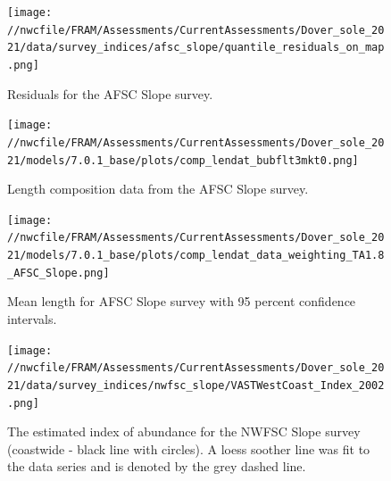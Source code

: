 \documentclass[11pt,
  english,
  a4paper,
]{article}
\begin{document}
\newpage


\begin{figure}
\centering
\texttt{[image: //nwcfile/FRAM/Assessments/CurrentAssessments/Dover\_sole\_2021/data/survey\_indices/afsc\_slope/quantile\_residuals\_on\_map.png]}
\caption{Residuals for the AFSC Slope survey.\label{fig:afsc-resid}}
\end{figure}

\tagmcend\tagstructend


\begin{figure}
\centering
\texttt{[image: //nwcfile/FRAM/Assessments/CurrentAssessments/Dover\_sole\_2021/models/7.0.1\_base/plots/comp\_lendat\_bubflt3mkt0.png]}
\caption{Length composition data from the AFSC Slope survey.\label{fig:afsc-len-data}}
\end{figure}

\tagmcend\tagstructend


\begin{figure}
\centering
\texttt{[image: //nwcfile/FRAM/Assessments/CurrentAssessments/Dover\_sole\_2021/models/7.0.1\_base/plots/comp\_lendat\_data\_weighting\_TA1.8\_AFSC\_Slope.png]}
\caption{Mean length for AFSC Slope survey with 95 percent confidence intervals.\label{fig:mean-afsc-len-data}}
\end{figure}

\tagmcend\tagstructend


\begin{figure}
\centering
\texttt{[image: //nwcfile/FRAM/Assessments/CurrentAssessments/Dover\_sole\_2021/data/survey\_indices/nwfsc\_slope/VASTWestCoast\_Index\_2002.png]}
\caption{The estimated index of abundance for the NWFSC Slope survey (coastwide - black line with circles). A loess soother line was fit to the data series and is denoted by the grey dashed line.\label{fig:nwfsc-index}}
\end{figure}
\end{document}
